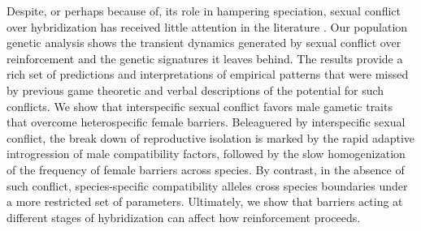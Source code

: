 \documentclass[11pt]{article}
\begin{document}
Despite, or perhaps because of, its role in hampering speciation, sexual conflict over hybridization has received little attention in the literature \citep[but see ][]{parker1998, gavrilets2005, gavrilets2014}.  
Our population genetic analysis shows the transient dynamics generated by sexual conflict over reinforcement and the genetic signatures it leaves behind. 
The results provide a rich set of predictions and interpretations of empirical patterns that were missed by previous game theoretic \citep{parker1998, gavrilets2005} and verbal \citep{coyneandorrbook} descriptions of the potential for such conflicts. 
We show that interspecific sexual conflict favors male gametic traits that overcome heterospecific female barriers. 
Beleaguered by interspecific sexual conflict, the break down of reproductive isolation is marked by the rapid adaptive introgression of male compatibility factors, followed by the slow homogenization of the frequency of female barriers across species. 
By contrast, in the absence of such conflict, species-specific compatibility alleles  cross species boundaries under a more restricted set of parameters.
Ultimately, we show that barriers acting at different stages of hybridization can affect how reinforcement proceeds.
\end{document}
